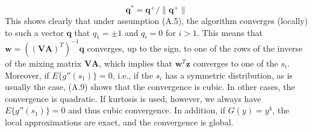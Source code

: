 \documentclass[12pt,a4paper,twoside,openany]{book}
\begin{document}
\begin{appendices}
\begin{equation}
        \mathbf{q}^* = \mathbf{q}^+ / \|\mathbf{q}^+\| \tag{A.10}
    \end{equation}
    This shows clearly that under assumption (A.5), the algorithm converges (locally) to such a vector $\mathbf{q}$ that $q_1 = \pm 1$ and $q_i = 0$ for $i > 1$. This means that $\mathbf{w} = ((\mathbf{V}\mathbf{A})^T)^{-1}\mathbf{q}$ converges, up to the sign, to one of the rows of the inverse of the mixing matrix $\mathbf{V}\mathbf{A}$, which implies that $\mathbf{w}^T\mathbf{z}$ converges to one of the $s_i$. Moreover, if $E\{g''(s_1)\} = 0$, i.e., if the $s_i$ has a symmetric distribution, as is usually the case, (A.9) shows that the convergence is cubic. In other cases, the convergence is quadratic. If kurtosis is used, however, we always have $E\{g''(s_1)\} = 0$ and thus cubic convergence. In addition, if $G(y) = y^4$, the local approximations are exact, and the convergence is global.
    
\end{appendices}
\end{document}
